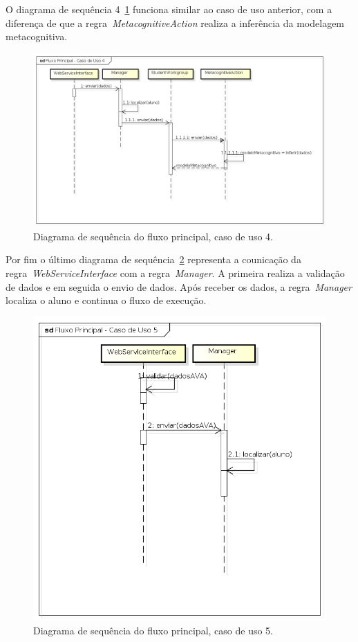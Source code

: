 O diagrama de sequência 4~\ref{fig:dss-uc4-fluxo-principal} funciona similar ao caso de uso anterior, com a diferença de que a regra~\emph{MetacognitiveAction} realiza a inferência da modelagem metacognitiva.

\begin{figure}
	\centering
	\includegraphics[scale=0.48]{images/dss-uc4-fluxo-principal.png}
	\caption{Diagrama de sequência do fluxo principal, caso de uso 4.}
	\label{fig:dss-uc4-fluxo-principal}
\end{figure}

Por fim o último diagrama de sequência~\ref{fig:dss-uc5-fluxo-principal} representa a counicação da regra~\emph{WebServiceInterface} com a regra~\emph{Manager}. A primeira realiza a validação de dados e em seguida o envio de dados. Após receber os dados, a regra~\emph{Manager} localiza o aluno e continua o fluxo de execução.

\begin{figure}
	\centering
	\includegraphics[scale=0.48]{images/dss-uc5-fluxo-principal.png}
	\caption{Diagrama de sequência do fluxo principal, caso de uso 5.}
	\label{fig:dss-uc5-fluxo-principal}
\end{figure}


